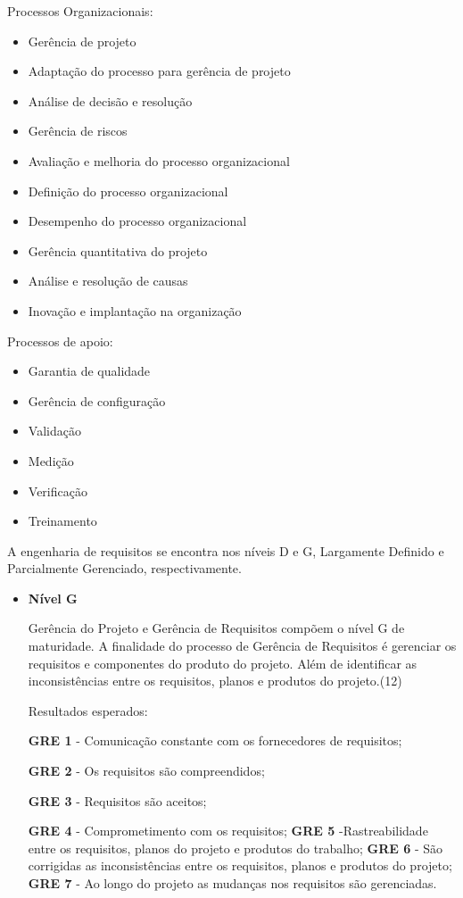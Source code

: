 \begin{itemize}
Processos Organizacionais:

\begin{itemize}
\item Gerência de projeto
\item Adaptação do processo para gerência de projeto
\item Análise de decisão e resolução
\item Gerência de riscos
\item Avaliação e melhoria do processo organizacional
\item Definição do processo organizacional
\item Desempenho do processo organizacional
\item Gerência quantitativa do projeto
\item Análise e resolução de causas
\item Inovação e implantação na organização
\end{itemize}

Processos de apoio:

\begin{itemize}
\item Garantia de qualidade
\item Gerência de configuração
\item Validação
\item Medição
\item Verificação
\item Treinamento
\end{itemize}

A engenharia de requisitos se encontra nos níveis D e G, Largamente Definido e Parcialmente Gerenciado, respectivamente.

\begin{itemize}
\item \textbf{Nível G}

Gerência do Projeto e Gerência de Requisitos compõem o nível G de maturidade.
A finalidade do processo de Gerência de Requisitos é gerenciar os requisitos e componentes do produto do projeto. Além de identificar as inconsistências entre os requisitos, planos e produtos do projeto.(12)

Resultados esperados:

\textbf{GRE 1} - Comunicação constante com os fornecedores de requisitos;

\textbf{GRE 2} - Os requisitos são compreendidos;

\textbf{GRE 3} - Requisitos são aceitos;

\textbf{GRE 4} - Comprometimento com os requisitos;
\textbf{GRE 5} -Rastreabilidade entre os requisitos, planos do projeto e produtos do trabalho;
\textbf{GRE 6} - São corrigidas as inconsistências entre os requisitos, planos e produtos do projeto;
\textbf{GRE 7} - Ao longo do projeto as mudanças nos requisitos são gerenciadas.


\end{itemize}
\end{itemize}
